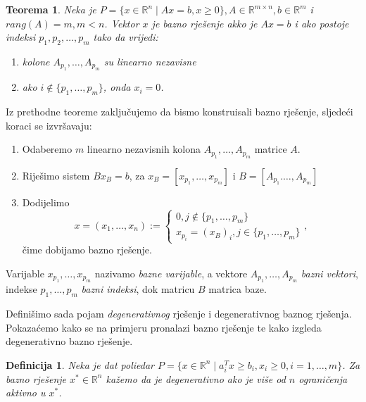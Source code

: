 \documentclass[a4paper, utf8, 11pt, colorlinks]{book}
\newtheorem{definition}{Definicija}
\newtheorem{thm}{Teorema}
\begin{document}
\begin{thm}
   Neka je $P = \{ x \in \mathbb{R}^n \mid A x = b, x \geq 0\}, A \in \mathbb{R}^{m \times n}, b \in \mathbb{R}^m$ i $rang(A)= m, m < n$.
   Vektor $x$ je bazno rješenje  akko je $A x = b$ i ako postoje indeksi $p_1,p_2,\ldots, p_m$ tako da vrijedi:
   \begin{enumerate}
       \item kolone $A_{p_1},\ldots, A_{p_m}$ su linearno nezavisne
       \item ako $i \notin \{p_1,\ldots, p_m\}$, onda $x_i = 0$.
   \end{enumerate}
   
\end{thm}
Iz prethodne teoreme zaključujemo da bismo  konstruisali bazno rješenje, sljedeći koraci se izvršavaju:
\begin{enumerate}
    \item Odaberemo $m$ linearno nezavisnih kolona $A_{p_1}, \ldots, A_{p_m}$ matrice $A$.
    \item Riješimo sistem $B x_B = b$, za $x_B = [x_{p_1}, \ldots, x_{p_m}]$ i $B= [A_{p_1}. \ldots, A_{p_m}]$
    \item Dodijelimo $$x = (x_1,\ldots, x_n):= \begin{cases}
    	          0, j  \not \in \{p_1,\ldots, p_m \} \\
    	         x_{p_i} = (x_B)_i, j \in \{ p_1,\ldots, p_m \}
    \end{cases},$$  čime dobijamo bazno rješenje. 
\end{enumerate}
Varijable $x_{p_1},\ldots, x_{p_m}$ nazivamo \emph{bazne varijable}, a vektore  $A_{p_1}, \ldots, A_{p_m}$ \emph{bazni vektori}, indekse $p_1,\ldots, p_m$ \emph{bazni indeksi}, dok matricu $B$ matrica baze. 


Definišimo sada pojam \emph{degenerativnog} rješenje i degenerativnog baznog rješenja. Pokazaćemo kako se na primjeru pronalazi bazno rješenje te kako izgleda degenerativno bazno rješenje.

\begin{definition}
      Neka je dat poliedar $P = \{ x \in \mathbb{R}^n \mid a_i^T x \geq b_i, x_i \geq 0, i=1,\ldots,m \}$. Za bazno rješenje $x^*\in \mathbb{R}^n$ kažemo da je degenerativno ako je više od $n$  ograničenja aktivno u $x^*$. 
      
\end{definition}
\end{document}
